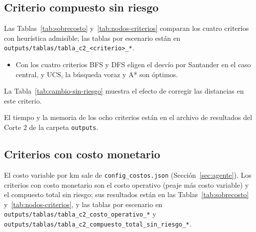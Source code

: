 \documentclass[12pt,a4paper]{article}
\begin{document}
\subsection{Criterio compuesto sin riesgo}

Las Tablas~\ref{tab:sobrecosto} y~\ref{tab:nodos-criterios} comparan los
cuatro criterios con heurística admisible; las tablas por escenario están en
\nolinkurl{outputs/tablas/tabla_c2_<criterio>_*}.

\begin{table}[!htbp]
\centering
\caption{Sobrecosto (\%) respecto del óptimo, en el caso central y en Bucaramanga a Bogotá (Buc.); Óptimos: máximo de UCS, voraz y A*. Fuente: elaboración propia}
\label{tab:sobrecosto}
\footnotesize\setlength{\tabcolsep}{4.5pt}

\end{table}

\begin{table}[!htbp]
\centering
\caption{Nodos expandidos sumados en los diez escenarios, por criterio y algoritmo. Fuente: elaboración propia}
\label{tab:nodos-criterios}
\small

\end{table}

\begin{itemize}
\item Con los cuatro criterios BFS y DFS eligen el desvío por Santander en el
caso central, y UCS, la búsqueda voraz y A* son óptimos.
\end{itemize}

La Tabla~\ref{tab:cambio-sin-riesgo} muestra el efecto de corregir las
distancias en este criterio.

\begin{table}[!htbp]
\centering
\caption{Costo compuesto sin riesgo de las dos rutas de Duitama a Puente Nacional, con las distancias sin corregir y con las corregidas. Fuente: elaboración propia}
\label{tab:cambio-sin-riesgo}
\small

\end{table}

El tiempo y la memoria de los ocho criterios están en el archivo de
resultados del Corte 2 de la carpeta \texttt{outputs}.

\subsection{Criterios con costo monetario}

El costo variable por km sale de \texttt{config\_costos.json}
(Sección~\ref{sec:agente}). Los criterios con costo monetario son el costo
operativo (peaje más costo variable) y el compuesto total sin riesgo; sus
resultados están en las Tablas~\ref{tab:sobrecosto} y~\ref{tab:nodos-criterios},
y las tablas por escenario en \nolinkurl{outputs/tablas/tabla_c2_costo_operativo_*} y
\nolinkurl{outputs/tablas/tabla_c2_compuesto_total_sin_riesgo_*}.
\end{document}
